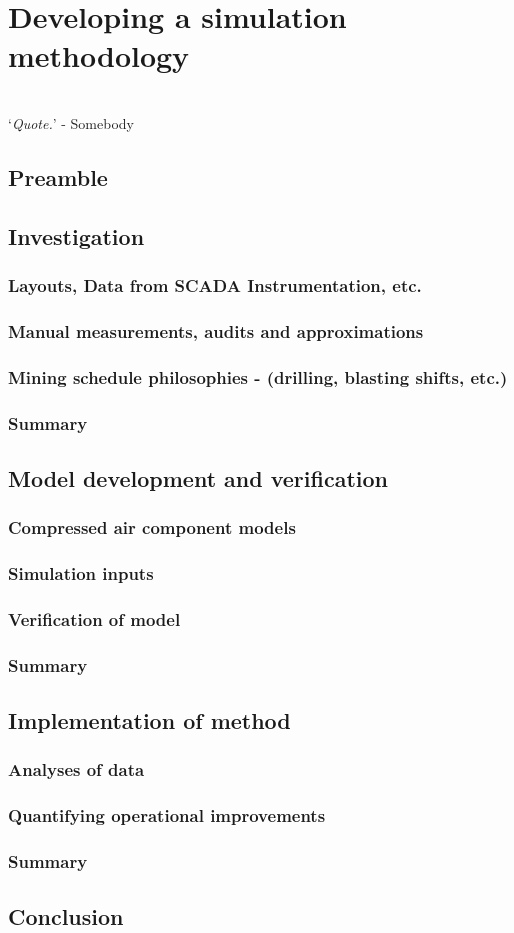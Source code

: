 \chapter{Developing a simulation methodology}
\vspace{38em}

\hrulefill
\\
\enquote*{\textit{Quote.}} - Somebody\\
\newpage
\section{Preamble}
\section{Investigation}
	\subsection{Layouts, Data from SCADA Instrumentation, etc.}
	\subsection{Manual measurements, audits and approximations}
	\subsection{Mining schedule philosophies \color{blue} - (drilling, blasting shifts, etc.)}
	\subsection{Summary}
\section{Model development and verification}
	\subsection{Compressed air component models}
	\subsection{Simulation inputs}
	\subsection{Verification of model}
	\subsection{Summary}
\section{Implementation of method}
	\subsection{Analyses of data}
	\subsection{Quantifying operational improvements}
	\subsection{Summary}
\section{Conclusion}